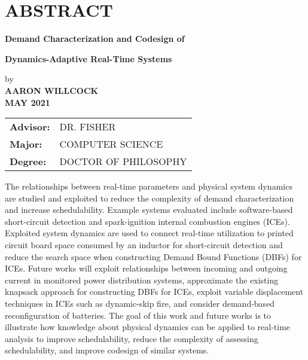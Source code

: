 \section*{ABSTRACT}

\centerline{\bf Demand Characterization and Codesign of }
\vspace{-0.4cm}
\centerline{\bf Dynamics-Adaptive Real-Time Systems}

{\setlength\baselineskip{0.3in}
\begin{center}
by\\
\medskip
{\bf AARON WILLCOCK}\\
\medskip
{\bf MAY 2021}\\
\end{center}
\Vspc
\begin{tabular}{ll}
	{\bf Advisor:} & DR. FISHER \\
	{\bf Major:} & COMPUTER SCIENCE \\
	{\bf Degree:} & DOCTOR OF PHILOSOPHY
\end{tabular}
}

\bigskip \bigskip

The relationships between real-time parameters and physical system dynamics are studied and exploited to reduce the complexity of demand characterization and increase schedulability.
Example systems evaluated include software-based short-circuit detection and spark-ignition internal combustion engines (ICEs).
Exploited system dynamics are used to connect real-time utilization to printed circuit board space consumed by an inductor for short-circuit detection and reduce the search space when constructing Demand Bound Functions (DBFs) for ICEs.
Future works will exploit relationships between incoming and outgoing current in monitored power distribution systems, approximate the existing knapsack approach for constructing DBFs for ICEs, exploit variable displacement techniques in ICEs such as dynamic-skip fire, and consider demand-based reconfiguration of batteries.
The goal of this work and future works is to illustrate how knowledge about physical dynamics can be applied to real-time analysis to improve schedulability, reduce the complexity of assessing schedulability, and improve codesign of similar systems.